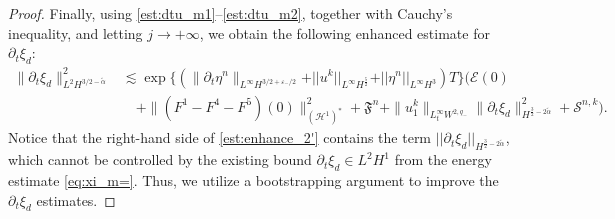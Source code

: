 \documentclass[letterpaper,reqno,10pt,twoside]{amsart}
\theoremstyle{definition}
\theoremstyle{remark}
\def\dt{\partial_t}
\def\p{\partial}
\begin{document}
\begin{proof}
		
		Finally, using \eqref{est:dtu_m1}--\eqref{est:dtu_m2}, together with Cauchy's inequality, and letting $j\rightarrow +\infty$, we obtain the following enhanced estimate for $\p_t\xi_{d}$: 
		\begin{equation}\label{est:enhance_2'}
			\begin{aligned}
				\|\p_t\xi_{d}\|_{L^2H^{3/2-\tilde{\alpha}}}^2
				&\lesssim\exp\big\{(\|\p_t\eta^{n}\|_{L^\infty H^{3/2+\varepsilon_-/2}}+\vert \vert u^{k}\vert \vert_{L^{\infty}H^{\frac{5}{2}}}+\vert \vert \eta^{n}\vert \vert_{L^{\infty}H^{3}})T\big\}\bigg(\mathcal{E}(0)\\
				&\quad+\|(F^1-F^4-F^5)(0)\|_{(\mathcal{H}^1)^\ast}^2+\mathfrak{F}^{n}+\|u_{1}^{k}\|_{L_{t}^{\infty}W^{2,q_{-}}}\|\p_{t}\xi_{d}\|^{2}_{H^{\frac{3}{2}-2\tilde{\alpha}}}+\mathscr{S}^{n,k}\bigg).
			\end{aligned}
		\end{equation}
		Notice that the right-hand side of \eqref{est:enhance_2'} contains the term $\vert \vert \partial_{t}\xi_{d}\vert \vert_{H^{\frac{3}{2}-2\tilde{\alpha}}}$, which cannot be controlled by the existing bound $\partial_{t}\xi_{d}\in L^{2}H^{1}$ from the energy estimate \eqref{eq:xi_m=}. Thus, we utilize a bootstrapping argument to improve the $\dt\xi_d$ estimates.
		

\end{proof}
\end{document}
